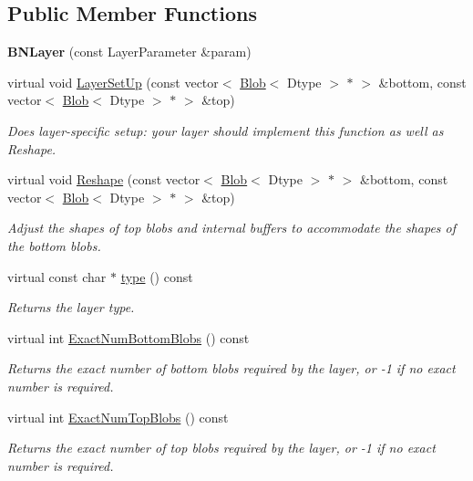 \subsection*{Public Member Functions}
\begin{DoxyCompactItemize}
\item 
{\bfseries B\+N\+Layer} (const Layer\+Parameter \&param)\hypertarget{classcaffe_1_1BNLayer_ae4fb79c408b580c55d72614768d5f067}{}\label{classcaffe_1_1BNLayer_ae4fb79c408b580c55d72614768d5f067}

\item 
virtual void \hyperlink{classcaffe_1_1BNLayer_aa9d76eb8118c22b13505a7fbbcc68c3f}{Layer\+Set\+Up} (const vector$<$ \hyperlink{classcaffe_1_1Blob}{Blob}$<$ Dtype $>$ $\ast$ $>$ \&bottom, const vector$<$ \hyperlink{classcaffe_1_1Blob}{Blob}$<$ Dtype $>$ $\ast$ $>$ \&top)
\begin{DoxyCompactList}\small\item\em Does layer-\/specific setup\+: your layer should implement this function as well as Reshape. \end{DoxyCompactList}\item 
virtual void \hyperlink{classcaffe_1_1BNLayer_ad925e8d7b344cd6714706d5fe7824c1b}{Reshape} (const vector$<$ \hyperlink{classcaffe_1_1Blob}{Blob}$<$ Dtype $>$ $\ast$ $>$ \&bottom, const vector$<$ \hyperlink{classcaffe_1_1Blob}{Blob}$<$ Dtype $>$ $\ast$ $>$ \&top)
\begin{DoxyCompactList}\small\item\em Adjust the shapes of top blobs and internal buffers to accommodate the shapes of the bottom blobs. \end{DoxyCompactList}\item 
virtual const char $\ast$ \hyperlink{classcaffe_1_1BNLayer_aabf5166f6a6531b756bd4593803cf217}{type} () const \hypertarget{classcaffe_1_1BNLayer_aabf5166f6a6531b756bd4593803cf217}{}\label{classcaffe_1_1BNLayer_aabf5166f6a6531b756bd4593803cf217}

\begin{DoxyCompactList}\small\item\em Returns the layer type. \end{DoxyCompactList}\item 
virtual int \hyperlink{classcaffe_1_1BNLayer_a534fd38c3c24115d5c5676362816157b}{Exact\+Num\+Bottom\+Blobs} () const 
\begin{DoxyCompactList}\small\item\em Returns the exact number of bottom blobs required by the layer, or -\/1 if no exact number is required. \end{DoxyCompactList}\item 
virtual int \hyperlink{classcaffe_1_1BNLayer_a4d608d903ec320429ef155d90aaf9926}{Exact\+Num\+Top\+Blobs} () const 
\begin{DoxyCompactList}\small\item\em Returns the exact number of top blobs required by the layer, or -\/1 if no exact number is required. \end{DoxyCompactList}\end{DoxyCompactItemize}
